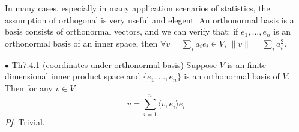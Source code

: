 \documentclass{article}
\begin{document}
\begin{Rmk}{}
    In many cases, especially in many application scenarios of statistics, the assumption of orthogonal is very useful and elegent. \textcolor{Df}{An orthonormal basis is a basis consists of orthonormal vectors}, and we can verify that: \textcolor{Th}{if $e_1, \dots, e_n$ is an orthonormal basis of an inner space, then $\forall v = \sum_{i} a_i e_i\in V$, $\|v\| = \sum_{i}a_i^2$.} 
\end{Rmk}

\begin{Th}{$\bullet$ Th7.4.1 (coordinates under orthonormal basis)}
    Suppose $V$ is an finite-dimensional inner product space and $\{e_1, \dots, e_n\}$ is an orthonormal basis of $V$. Then for any $v\in V$:
    $$v = \sum_{i=1}^{n}\langle v,e_i\rangle e_i$$
    \tcblower
    \textit{Pf}: Trivial.
\end{Th}
\end{document}
